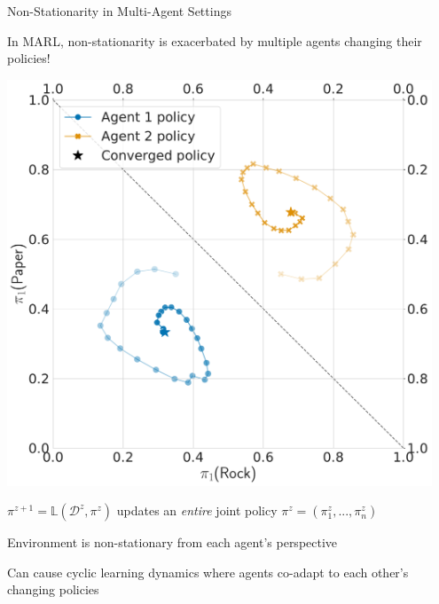 \begin{frame}[t]{Non-Stationarity in Multi-Agent Settings}

In MARL, non-stationarity is exacerbated by multiple agents changing their policies!

\vspace{15pt}

\bcol
        \includegraphics[width=0.95\textwidth]{images/chapter_5/wolfphc_rps_own.pdf}

		\blist
		    \item $\pi^{z+1} = \mathbb{L}(\mathcal{D}^z, \pi^z)$ updates an {\it entire} joint policy $\pi^z = (\pi_1^z, ..., \pi_n^z)$
		    \item Environment is non-stationary from each agent's perspective
		    \item Can cause cyclic learning dynamics where agents co-adapt to each other's changing policies 
		\elist

\ecol
\end{frame}

